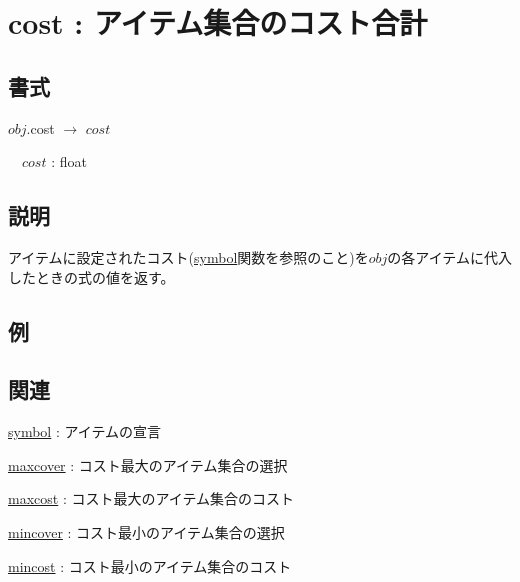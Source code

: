 
\section{cost : アイテム集合のコスト合計\label{sect:cost}}
\subsection*{書式}
$obj$.cost $\rightarrow$ $cost$

~~$cost$ : float

\subsection*{説明}
アイテムに設定されたコスト(\hyperref[sect:symbol]{symbol}関数を参照のこと)を$obj$の各アイテムに代入したときの式の値を返す。


\subsection*{例}


\subsection*{関連}
\hyperref[sect:symbol]{symbol} : アイテムの宣言

\hyperref[sect:maxcover]{maxcover} : コスト最大のアイテム集合の選択

\hyperref[sect:maxcost]{maxcost} : コスト最大のアイテム集合のコスト

\hyperref[sect:mincover]{mincover} : コスト最小のアイテム集合の選択

\hyperref[sect:mincost]{mincost} : コスト最小のアイテム集合のコスト

